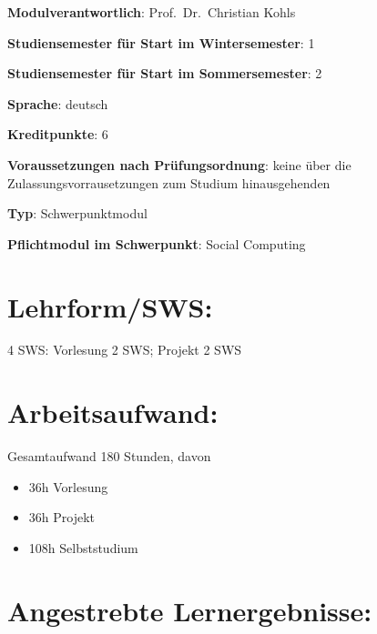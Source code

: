 \begin{modulHead}
\textbf{Modulverantwortlich}: Prof.~Dr.~Christian
Kohls
\end{modulHead}
\begin{modulHead}
\textbf{Studiensemester für
Start im Wintersemester}:
1
\end{modulHead}
\begin{modulHead}
\textbf{Studiensemester für Start
im Sommersemester}:
2
\end{modulHead}
\begin{modulHead}
\textbf{Sprache}:
deutsch
\end{modulHead}
\begin{modulHead}
\textbf{Kreditpunkte}:
6
\end{modulHead}
\begin{modulHead}
\textbf{Voraussetzungen nach
Prüfungsordnung}: keine über die Zulassungsvorrausetzungen zum Studium
hinausgehenden
\end{modulHead}
\begin{modulHead}
\textbf{Typ}:
Schwerpunktmodul
\end{modulHead}
\begin{modulHead}
\textbf{Pflichtmodul
im Schwerpunkt}: Social Computing
\end{modulHead}


\section*{Lehrform/SWS:}\label{lehrformsws-12}

4 SWS: Vorlesung 2 SWS; Projekt 2 SWS

\section*{Arbeitsaufwand:}\label{arbeitsaufwand-13}

Gesamtaufwand 180 Stunden, davon

\begin{itemize}
\tightlist
\item
  36h Vorlesung
\item
  36h Projekt
\item
  108h Selbststudium
\end{itemize}

\section*{Angestrebte
Lernergebnisse:}\label{angestrebte-lernergebnisse-12}

